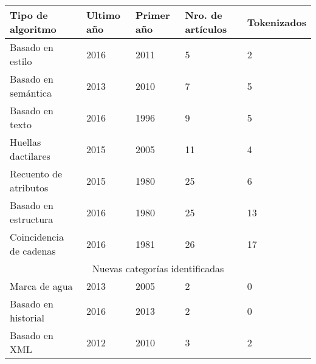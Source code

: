 \begin{table}[ht!]
\centering
\begin{tabular}{|lllll|}
\hline
\multicolumn{1}{|l|}{Tipo de algoritmo}       & \multicolumn{1}{l|}{Ultimo año} & \multicolumn{1}{l|}{Primer año} & \multicolumn{1}{l|}{Nro. de artículos} & Tokenizados \\ \hline
\multicolumn{1}{|l|}{Basado en estilo}        & \multicolumn{1}{l|}{2016}       & \multicolumn{1}{l|}{2011}       & \multicolumn{1}{l|}{5}                 & 2           \\ \hline
\multicolumn{1}{|l|}{Basado en semántica}     & \multicolumn{1}{l|}{2013}       & \multicolumn{1}{l|}{2010}       & \multicolumn{1}{l|}{7}                 & 5           \\ \hline
\multicolumn{1}{|l|}{Basado en texto}         & \multicolumn{1}{l|}{2016}       & \multicolumn{1}{l|}{1996}       & \multicolumn{1}{l|}{9}                 & 5           \\ \hline
\multicolumn{1}{|l|}{Huellas dactilares}      & \multicolumn{1}{l|}{2015}       & \multicolumn{1}{l|}{2005}       & \multicolumn{1}{l|}{11}                & 4           \\ \hline
\multicolumn{1}{|l|}{Recuento de atributos}   & \multicolumn{1}{l|}{2015}       & \multicolumn{1}{l|}{1980}       & \multicolumn{1}{l|}{25}                & 6           \\ \hline
\multicolumn{1}{|l|}{Basado en estructura}    & \multicolumn{1}{l|}{2016}       & \multicolumn{1}{l|}{1980}       & \multicolumn{1}{l|}{25}                & 13          \\ \hline
\multicolumn{1}{|l|}{Coincidencia de cadenas} & \multicolumn{1}{l|}{2016}       & \multicolumn{1}{l|}{1981}       & \multicolumn{1}{l|}{26}                & 17          \\ \hline
\multicolumn{5}{|c|}{Nuevas categorías identificadas}                                                                                                                    \\ \hline
\multicolumn{1}{|l|}{Marca de agua}           & \multicolumn{1}{l|}{2013}       & \multicolumn{1}{l|}{2005}       & \multicolumn{1}{l|}{2}                 & 0           \\ \hline
\multicolumn{1}{|l|}{Basado en historial}     & \multicolumn{1}{l|}{2016}       & \multicolumn{1}{l|}{2013}       & \multicolumn{1}{l|}{2}                 & 0           \\ \hline
\multicolumn{1}{|l|}{Basado en XML}           & \multicolumn{1}{l|}{2012}       & \multicolumn{1}{l|}{2010}       & \multicolumn{1}{l|}{3}                 & 2           \\ \hline

\end{tabular}
\end{table}
